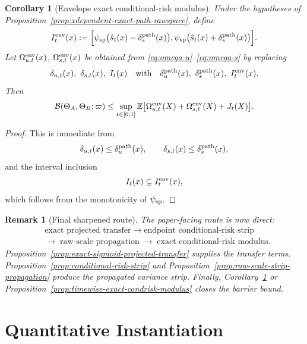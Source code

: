 \documentclass[11pt]{article}
\newtheorem{remark}{Remark}
\newtheorem{corollary}{Corollary}
\newcommand{\E}{\mathbb{E}}
\newcommand{\cB}{\mathcal{B}}
\begin{document}
\begin{corollary}[Envelope exact conditional-risk modulus]
\label{cor:envelope-exact-condrisk-modulus}
Under the hypotheses of
Proposition~\ref{prop:xdependent-exact-path-rawspace}, define
\[
  I_t^{\rm env}(x)
  :=
  \Bigl[
    \psi_{\rm sp}\bigl(\hat s_t(x)-\delta_s^{\rm path}(x)\bigr),
    \psi_{\rm sp}\bigl(\hat s_t(x)+\delta_s^{\rm path}(x)\bigr)
  \Bigr].
\]
Let $\Omega^{\rm env}_{u,t}(x)$, $\Omega^{\rm env}_{s,t}(x)$ be obtained from
\eqref{eq:omega-u}--\eqref{eq:omega-s} by replacing
\[
  \delta_{u,t}(x),\ \delta_{s,t}(x),\ I_t(x)
  \quad\text{with}\quad
  \delta_u^{\rm path}(x),\ \delta_s^{\rm path}(x),\ I_t^{\rm env}(x).
\]
Then
\begin{equation}
  \cB(\Theta_A,\Theta_B;\varpi)
  \le
  \sup_{t\in[0,1]}
  \E\bigl[
    \Omega^{\rm env}_{u,t}(X)
    +
    \Omega^{\rm env}_{s,t}(X)
    +
    J_t(X)
  \bigr].
  \label{eq:envelope-exact-condrisk-modulus}
\end{equation}
\end{corollary}

\begin{proof}
This is immediate from
\[
  \delta_{u,t}(x)\le\delta_u^{\rm path}(x),
  \qquad
  \delta_{s,t}(x)\le\delta_s^{\rm path}(x),
\]
and the interval inclusion
\[
  I_t(x)\subseteq I_t^{\rm env}(x),
\]
which follows from the monotonicity of $\psi_{\rm sp}$.
\end{proof}

\begin{remark}[Final sharpened route]
The paper-facing route is now direct:
\begin{align*}
  &\text{exact projected transfer}
  \;\to\;
  \text{endpoint conditional-risk strip}
  \\
  &\to\;
  \text{raw-scale propagation}
  \;\to\;
  \text{exact conditional-risk modulus}.
\end{align*}
Proposition~\ref{prop:exact-sigmoid-projected-transfer} supplies the transfer
terms. Proposition~\ref{prop:conditional-risk-strip} and
Proposition~\ref{prop:raw-scale-strip-propagation} produce the propagated
variance strip. Finally,
Corollary~\ref{cor:envelope-exact-condrisk-modulus} or
Proposition~\ref{prop:timewise-exact-condrisk-modulus} closes the barrier
bound.
\end{remark}

\section{Quantitative Instantiation}
\end{document}
